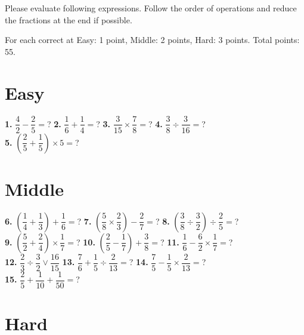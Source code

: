 \documentclass[a4paper]{article}
\newcommand{\lr}[1]{\left({#1}\right)} %
\begin{document}
\begin{Large}

Please evaluate following expressions. Follow the order of operations and reduce the fractions at the end if possible.

For each correct at Easy: 1 point, Middle: 2 points, Hard: 3 points. Total points: 55.

\section* {Easy}
		
\textbf{1.} $\dfrac{4}{2} - \dfrac 25 =$? \hspace{0.3cm}
\textbf{2.} $\dfrac{1}{6} + \dfrac 14 =$? \hspace{0.3cm}
\textbf{3.} $\dfrac{3}{15} \times \dfrac 78=$? \hspace{0.3cm}
\textbf{4.} $\dfrac{3}{8} \div \dfrac {3}{16}=$? \\[0.75cm]
\textbf{5.} $\lr{\dfrac{2}{5} + \dfrac 15} \times 5=$?


\section* {Middle}
		
\textbf{6.} $\lr{\dfrac{1}{4} + \dfrac{1}{3}} + \dfrac{1}{6}=$? \hspace{0.3cm}
\textbf{7.} $\lr{\dfrac{5}{8} \times \dfrac{2}{3}} - \dfrac{2}{7}=$? \hspace{0.3cm}
\textbf{8.} $\lr{\dfrac{3}{8} \div \dfrac{3}{2}} \div \dfrac{2}{5}=$? \\[0.75cm]
\textbf{9.} $\lr{\dfrac{5}{2} + \dfrac{2}{4}} \times \dfrac{1}{7}=$? \hspace{0.3cm}
\textbf{10.} $\lr{\dfrac{2}{5} - \dfrac{1}{7}} + \dfrac{3}{8}=$? \hspace{0.3cm} 
\textbf{11.} $\dfrac{1}{6} - \dfrac{6}{2} \times \dfrac{1}{7}=$? \\[0.75cm]
\textbf{12.} $\dfrac{2}{3} \div \dfrac{3}{2} \vee \dfrac{16}{15}$ \hspace{0.3cm}
\textbf{13.} $\dfrac{7}{6} + \dfrac{1}{5} \div \dfrac{2}{13}=$? \hspace{0.3cm}
\textbf{14.} $\dfrac{7}{5} - \dfrac{1}{5} \times \dfrac{2}{13}=$? \\[0.75cm]
\textbf{15.} $\dfrac{2}{5} + \dfrac{1}{10} + \dfrac{1}{50}=$?
		
\section* {Hard}


\end{Large}
\end{document}
